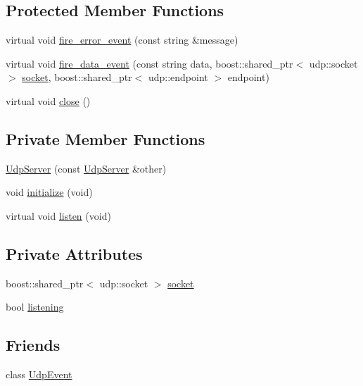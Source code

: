 \subsection*{Protected Member Functions}
\begin{DoxyCompactItemize}
\item 
virtual void \hyperlink{classUdpServer_aa9a023a74c61ba03af476f12958385df}{fire\_\-error\_\-event} (const string \&message)
\item 
virtual void \hyperlink{classUdpServer_ab3bcedec1031181a7dd3affddf3d8447}{fire\_\-data\_\-event} (const string data, boost::shared\_\-ptr$<$ udp::socket $>$ \hyperlink{classUdpServer_a0d49aeb5d5e8291f45487c1d2d082cee}{socket}, boost::shared\_\-ptr$<$ udp::endpoint $>$ endpoint)
\item 
virtual void \hyperlink{classUdpServer_a020144da72e1f29be85ed99225372b21}{close} ()
\end{DoxyCompactItemize}
\subsection*{Private Member Functions}
\begin{DoxyCompactItemize}
\item 
\hyperlink{classUdpServer_a61cfe5dd591450b5486225ab3524bbce}{UdpServer} (const \hyperlink{classUdpServer}{UdpServer} \&other)
\item 
void \hyperlink{classUdpServer_ad5e78e7f2bf29df163003de78fb1c44e}{initialize} (void)
\item 
virtual void \hyperlink{classUdpServer_ad1c4a040a4c510ecd85b9b9c7e61e995}{listen} (void)
\end{DoxyCompactItemize}
\subsection*{Private Attributes}
\begin{DoxyCompactItemize}
\item 
boost::shared\_\-ptr$<$ udp::socket $>$ \hyperlink{classUdpServer_a0d49aeb5d5e8291f45487c1d2d082cee}{socket}
\item 
bool \hyperlink{classUdpServer_a57c16849cfe745828a022aa7346d40d7}{listening}
\end{DoxyCompactItemize}
\subsection*{Friends}
\begin{DoxyCompactItemize}
\item 
class \hyperlink{classUdpServer_aa3db591e179836aff8d4a6d952d43101}{UdpEvent}
\end{DoxyCompactItemize}


